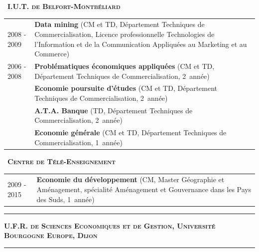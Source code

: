 \documentclass[a4paper,12pt]{article}
\newcommand{\titre}[1]{%
	\bigskip
	\noindent \rule[2mm]{\textwidth}{0.5pt}
	\textbf{\textsc{\large #1}} \\
	\noindent \rule[1mm]{\textwidth}{0.5pt}
	}
\newcommand{\smalltitre}[1]{%
	\noindent \textbullet~\textsc{\textbf{#1}}
	\smallskip
	}
\begin{document}

\smalltitre{I.U.T. de Belfort-Montbéliard}

\noindent \begin{longtable}{@{}p{\annee}p{\texte}@{}}
2008 - 2009 & \textbf{Data mining} (CM et TD, Département Techniques de Commercialisation, Licence professionnelle Technologies de l'Information et de la Communication Appliquées au Marketing et au Commerce) \\
2006 - 2008 & \textbf{Problématiques économiques appliquées} (CM et TD, Département Techniques de Commercialisation, 2\ieme{}~année) \\
			& \textbf{Economie poursuite d'études} (CM et TD, Département Techniques de Commercialisation, 2\ieme{}~année) \\
			& \textbf{A.T.A. Banque} (TD, Département Techniques de Commercialisation, 2\ieme{}~année) \\
			& \textbf{Economie générale} (CM et TD, Département Techniques de Commercialisation, 1\iere{}~année)
\end{longtable}


\smalltitre{Centre de Télé-Enseignement}

\noindent \begin{longtable}{@{}p{\annee}p{\texte}@{}}
2009 - 2015	& \textbf{Economie du développement} (CM, Master Géographie et Aménagement, spécialité Aménagement et Gouvernance dans les Pays des Suds, 1\iere{}~année) \\
\end{longtable}

\titre{U.F.R. de Sciences Economiques et de Gestion, Université Bourgogne Europe, Dijon}
\end{document}
